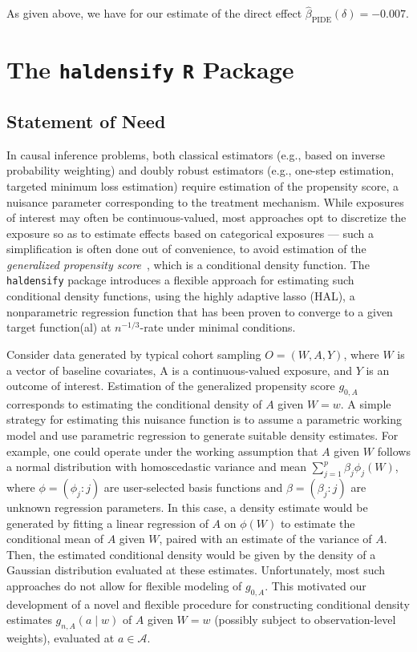 As given above, we have for our estimate of the direct effect
$\hat{\beta}_{\text{PIDE}}({\delta}) = -0.007$.

\section{The \texttt{haldensify} \texttt{R} Package}

\subsection{Statement of Need}

In causal inference problems, both classical estimators (e.g., based on inverse
probability weighting) and doubly robust estimators (e.g., one-step estimation,
targeted minimum loss estimation) require estimation of the propensity score, a
nuisance parameter corresponding to the treatment mechanism. While exposures of
interest may often be continuous-valued, most approaches opt to discretize the
exposure so as to estimate effects based on categorical exposures --- such
a simplification is often done out of convenience, to avoid estimation of the
\textit{generalized propensity score}~\citep{hirano2004propensity,
imai2004causal}, which is a conditional density function. The
\texttt{haldensify} package introduces a flexible approach for estimating such
conditional density functions, using the highly adaptive lasso (HAL),
a nonparametric regression function that has been proven to converge to a given
target function(al) at $n^{-1/3}$-rate under minimal conditions.

Consider data generated by typical cohort sampling $O = (W, A, Y)$, where $W$ is
a vector of baseline covariates, A is a continuous-valued exposure, and $Y$ is
an outcome of interest. Estimation of the generalized propensity score $g_{0,A}$
corresponds to estimating the conditional density of $A$ given $W = w$. A simple
strategy for estimating this nuisance function is to assume a parametric working
model and use parametric regression to generate suitable density estimates. For
example, one could operate under the working assumption that $A$ given $W$
follows a normal distribution with homoscedastic variance and mean
$\sum_{j=1}^p \beta_j \phi_j(W)$, where $\phi = (\phi_j : j)$ are user-selected
basis functions and $\beta = (\beta_j : j)$ are unknown regression parameters.
In this case, a density estimate would be generated by fitting a linear
regression of $A$ on $\phi(W)$ to estimate the conditional mean of $A$ given
$W$, paired with an estimate of the variance of $A$. Then, the estimated
conditional density would be given by the density of a Gaussian distribution
evaluated at these estimates. Unfortunately, most such approaches do not allow
for flexible modeling of $g_{0,A}$. This motivated our development of a novel
and flexible procedure for constructing conditional density estimates
$g_{n,A}(a \mid w)$ of $A$ given $W = w$ (possibly subject to observation-level
weights), evaluated at $a \in \mathcal{A}$.

